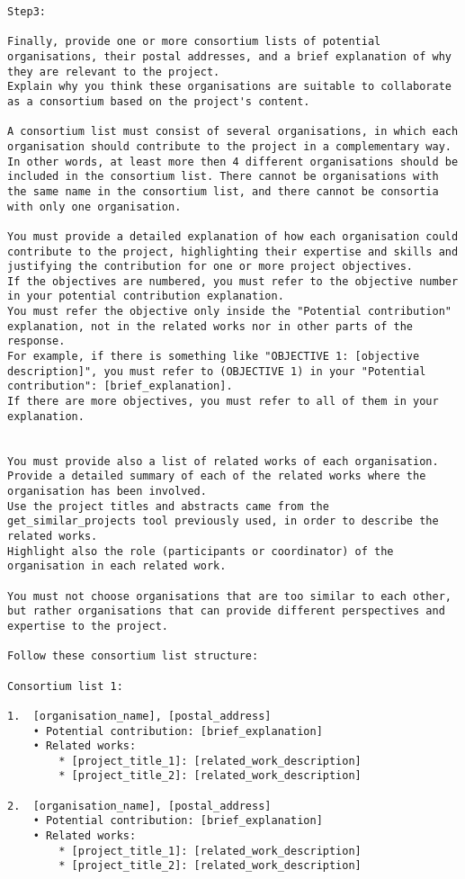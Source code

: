 \begin{lstlisting}
Step3:

Finally, provide one or more consortium lists of potential organisations, their postal addresses, and a brief explanation of why they are relevant to the project.
Explain why you think these organisations are suitable to collaborate as a consortium based on the project's content.

A consortium list must consist of several organisations, in which each organisation should contribute to the project in a complementary way.
In other words, at least more then 4 different organisations should be included in the consortium list. There cannot be organisations with the same name in the consortium list, and there cannot be consortia with only one organisation.

You must provide a detailed explanation of how each organisation could contribute to the project, highlighting their expertise and skills and justifying the contribution for one or more project objectives.
If the objectives are numbered, you must refer to the objective number in your potential contribution explanation.
You must refer the objective only inside the "Potential contribution" explanation, not in the related works nor in other parts of the response.
For example, if there is something like "OBJECTIVE 1: [objective description]", you must refer to (OBJECTIVE 1) in your "Potential contribution": [brief_explanation].
If there are more objectives, you must refer to all of them in your explanation.


You must provide also a list of related works of each organisation.
Provide a detailed summary of each of the related works where the organisation has been involved.
Use the project titles and abstracts came from the get_similar_projects tool previously used, in order to describe the related works.
Highlight also the role (participants or coordinator) of the organisation in each related work.

You must not choose organisations that are too similar to each other, but rather organisations that can provide different perspectives and expertise to the project.

Follow these consortium list structure:

Consortium list 1:

1.  [organisation_name], [postal_address]
    • Potential contribution: [brief_explanation] 
    • Related works:
        * [project_title_1]: [related_work_description]
        * [project_title_2]: [related_work_description]
    
2.  [organisation_name], [postal_address]
    • Potential contribution: [brief_explanation]
    • Related works:
        * [project_title_1]: [related_work_description]
        * [project_title_2]: [related_work_description]
    

\end{lstlisting}
